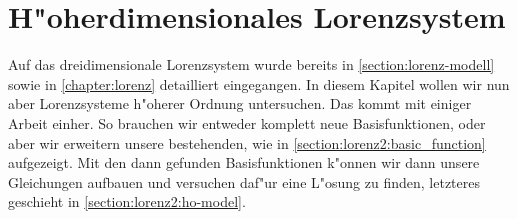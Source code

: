 %
%
%
\chapter{H"oherdimensionales Lorenzsystem\label{chapter:lorenz2}}
\begin{refsection}

Auf das dreidimensionale Lorenzsystem wurde bereits in 
\cref{section:lorenz-modell} sowie in \cref{chapter:lorenz} detailliert 
eingegangen. In diesem Kapitel wollen wir nun aber Lorenzsysteme h"oherer 
Ordnung untersuchen. Das kommt mit einiger Arbeit einher. So brauchen wir 
entweder komplett neue Basisfunktionen, oder aber wir erweitern unsere 
bestehenden, wie in \cref{section:lorenz2:basic_function} aufgezeigt. Mit den 
dann gefunden Basisfunktionen k"onnen wir dann unsere Gleichungen aufbauen und 
versuchen daf"ur eine L"osung zu finden, letzteres geschieht in 
\cref{section:lorenz2:ho-model}.









\printbibliography[heading=subbibliography]
\end{refsection}
